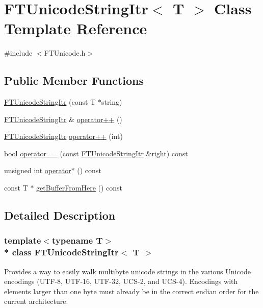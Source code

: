 \hypertarget{class_f_t_unicode_string_itr}{}\section{F\+T\+Unicode\+String\+Itr$<$ T $>$ Class Template Reference}
\label{class_f_t_unicode_string_itr}


{\ttfamily \#include $<$F\+T\+Unicode.\+h$>$}

\subsection*{Public Member Functions}
\begin{DoxyCompactItemize}
\item 
\hyperlink{class_f_t_unicode_string_itr_ab640405eaa904f1609f1b659e5657989}{F\+T\+Unicode\+String\+Itr} (const T $\ast$string)
\item 
\hyperlink{class_f_t_unicode_string_itr}{F\+T\+Unicode\+String\+Itr} \& \hyperlink{class_f_t_unicode_string_itr_a476aa8e48d5ea56de9ee979af1cd4007}{operator++} ()
\item 
\hyperlink{class_f_t_unicode_string_itr}{F\+T\+Unicode\+String\+Itr} \hyperlink{class_f_t_unicode_string_itr_a84c9354998144c4f221cde699e3f8455}{operator++} (int)
\item 
bool \hyperlink{class_f_t_unicode_string_itr_ae27e7162e014fbcbf731a50bd34b2946}{operator==} (const \hyperlink{class_f_t_unicode_string_itr}{F\+T\+Unicode\+String\+Itr} \&right) const 
\item 
unsigned int \hyperlink{class_f_t_unicode_string_itr_a90300d6888d77e7a349b0d476a7c0bb4}{operator$\ast$} () const 
\item 
const T $\ast$ \hyperlink{class_f_t_unicode_string_itr_a8ced99f40fd1af46e0a76b844187efe1}{get\+Buffer\+From\+Here} () const 
\end{DoxyCompactItemize}


\subsection{Detailed Description}
\subsubsection*{template$<$typename T$>$\\*
class F\+T\+Unicode\+String\+Itr$<$ T $>$}

Provides a way to easily walk multibyte unicode strings in the various Unicode encodings (U\+T\+F-\/8, U\+T\+F-\/16, U\+T\+F-\/32, U\+C\+S-\/2, and U\+C\+S-\/4). Encodings with elements larger than one byte must already be in the correct endian order for the current architecture. 


